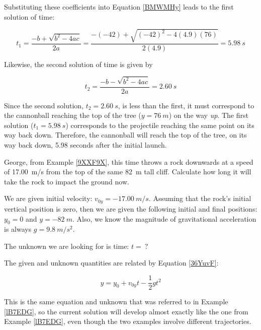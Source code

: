 \documentclass{article}
\begin{document}
Substituting these coefficients into Equation \eqref{BMWMHy} leads to the first solution of time:

\begin{equation*}
    t_1 = \frac{-b + \sqrt{b^2 - 4ac}}{2a} = \frac{-(-42) + \sqrt{(-42)^2 - 4 (4.9)(76)}}{2(4.9)} = \SI{5.98}{s}
\end{equation*}

Likewise, the second solution of time is given by

\begin{equation*}
    t_2 = \frac{-b - \sqrt{b^2 - 4ac}}{2a} = \SI{2.60}{s}
\end{equation*}

Since the second solution, $t_2 = \SI{2.60}{s}$, is less than the first, it must correspond to the cannonball reaching the top of the tree ($y=\SI{76}{m}$) on the way \textit{up}. The first solution ($t_1 = \SI{5.98}{s}$) corresponds to the projectile reaching the same point on its way back down. Therefore, the cannonball will reach the top of the tree, on its way back down, 5.98 seconds after the initial launch.

\endsolution


\begin{example} \label{pyn6Go}
    George, from Example \ref{9XXF9X}, this time throws a rock downwards at a speed of \SI{17.00}{m/s} from the top of the same \SI{82}{m} tall cliff. Calculate how long it will take the rock to impact the ground now.
\end{example}

\Solution We are given initial velocity: $v_{0y} = \SI{-17.00}{m/s}$. Assuming that the rock's initial vertical position is zero, then we are given the following initial and final positions: $y_0 = 0$ and $y = \SI{-82}{m}$. Also, we know the magnitude of gravitational acceleration is always $g = \SI{9.8}{m/s^2}$. 

\vspace{1em}

The unknown we are looking for is time: $t =\ ?$

\vspace{1em}

The given and unknown quantities are related by Equation \eqref{36YuvF}:

\begin{equation*}
    y = y_0 + v_{0y}t - \frac{1}{2}  g t^2
\end{equation*}

This is the same equation and unknown that was referred to in Example \ref{lB7EDG}, so the current solution will develop almost exactly like the one from Example \ref{lB7EDG}, even though the two examples involve different trajectories.
\end{document}
